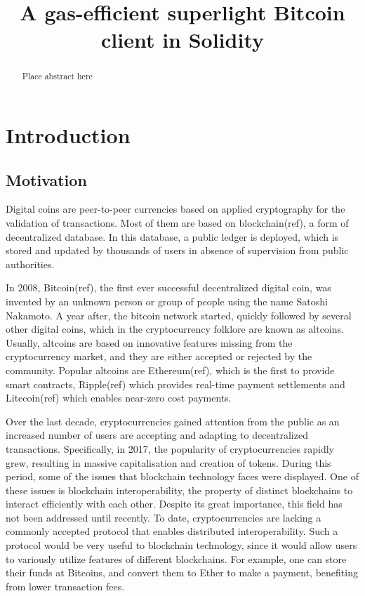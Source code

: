 \documentclass{article}
\title{A gas-efficient superlight Bitcoin client in Solidity}
\begin{document}
  \maketitle

  \begin{abstract}
    Place abstract here
  \end{abstract}

  \pagebreak

  \section{Introduction}

  \subsection{Motivation}

  Digital coins are peer-to-peer currencies based on applied
  cryptography for the validation of transactions. Most of them are
  based on blockchain(ref), a form of decentralized database. In this
  database, a public ledger is deployed, which is stored and updated by
  thousands of users in absence of supervision from public authorities.

  In 2008, Bitcoin(ref), the first ever successful decentralized digital
  coin, was invented by an unknown person or group of people using the
  name Satoshi Nakamoto. A year after, the bitcoin network started,
  quickly followed by several other digital coins, which in the
  cryptocurrency folklore are known as altcoins. Usually, altcoins are
  based on innovative features missing from the cryptocurrency market,
  and they are either accepted or rejected by the community. Popular
  altcoins are Ethereum(ref), which is the first to provide smart
  contracts, Ripple(ref) which provides real-time payment settlements
  and Litecoin(ref) which enables near-zero cost payments.

  Over the last decade, cryptocurrencies gained attention from the
  public as an increased number of users are accepting and adapting to
  decentralized transactions. Specifically, in 2017, the popularity of
  cryptocurrencies rapidly grew, resulting in massive capitalisation and
  creation of tokens. During this period, some of the issues that
  blockchain technology faces were displayed. One of these issues is
  blockchain interoperability, the property of distinct blockchains to
  interact efficiently with each other. Despite its great importance,
  this field has not been addressed until recently. To date,
  cryptocurrencies are lacking a commonly accepted protocol that enables
  distributed interoperability. Such a protocol would be very useful to
  blockchain technology, since it would allow users to variously utilize
  features of different blockchains. For example, one can store their
  funds at Bitcoins, and convert them to Ether to make a payment,
  benefiting from lower transaction fees.
\end{document}
